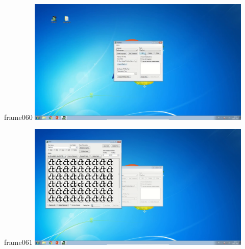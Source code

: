\documentclass{beamer}
\begin{document}
\begin{frame}{frame060}
\includegraphics[width=0.8\textwidth]{output/exported-frames/frame060.png}
\note{}
\end{frame}

\begin{frame}{frame061}
\includegraphics[width=0.8\textwidth]{output/exported-frames/frame061.png}
\note{}
\end{frame}
\end{document}
